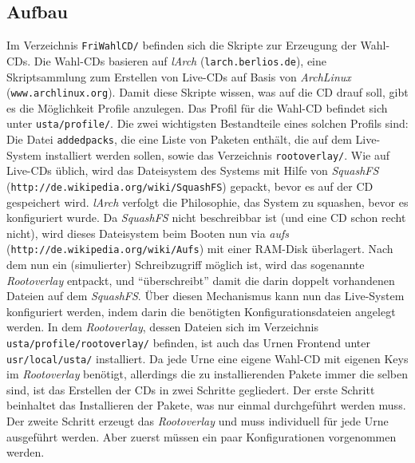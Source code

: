 \documentclass[a4paper,10pt]{article}
\begin{document}
\subsection{Aufbau}
Im Verzeichnis \texttt{FriWahlCD/} befinden sich die Skripte zur Erzeugung der Wahl-CDs. Die Wahl-CDs basieren auf \textit{lArch} (\texttt{larch.berlios.de}), eine Skriptsammlung zum Erstellen von Live-CDs auf Basis von \textit{ArchLinux} (\texttt{www.archlinux.org}). Damit diese Skripte wissen, was auf die CD drauf soll, gibt es die Möglichkeit Profile anzulegen. Das Profil für die Wahl-CD befindet sich unter \texttt{usta/profile/}. Die zwei wichtigsten Bestandteile eines solchen Profils sind: Die Datei \texttt{addedpacks}, die eine Liste von Paketen enthält, die auf dem Live-System installiert werden sollen, sowie das Verzeichnis \texttt{rootoverlay/}. Wie auf Live-CDs üblich, wird das Dateisystem des Systems mit Hilfe von \textit{SquashFS} (\texttt{http://de.wikipedia.org/wiki/SquashFS}) gepackt, bevor es auf der CD gespeichert wird. \textit{lArch} verfolgt die Philosophie, das System zu squashen, bevor es konfiguriert wurde. Da \textit{SquashFS} nicht beschreibbar ist (und eine CD schon recht nicht), wird dieses Dateisystem beim Booten nun via \textit{aufs} (\texttt{http://de.wikipedia.org/wiki/Aufs}) mit einer RAM-Disk überlagert. Nach dem nun ein (simulierter) Schreibzugriff möglich ist, wird das sogenannte \textit{Rootoverlay} entpackt, und ``überschreibt'' damit die darin doppelt vorhandenen Dateien auf dem \textit{SquashFS}. Über diesen Mechanismus kann nun das Live-System konfiguriert werden, indem darin die benötigten Konfigurationsdateien angelegt werden. In dem \textit{Rootoverlay}, dessen Dateien sich im Verzeichnis \texttt{usta/profile/rootoverlay/} befinden, ist auch das Urnen Frontend unter \texttt{usr/local/usta/} installiert. Da jede Urne eine eigene Wahl-CD mit eigenen Keys im \textit{Rootoverlay} benötigt, allerdings die zu installierenden Pakete immer die selben sind, ist das Erstellen der CDs in zwei Schritte gegliedert. Der erste Schritt beinhaltet das Installieren der Pakete, was nur einmal durchgeführt werden muss. Der zweite Schritt erzeugt das \textit{Rootoverlay} und muss individuell für jede Urne ausgeführt werden. Aber zuerst müssen ein paar Konfigurationen vorgenommen werden.
\end{document}
